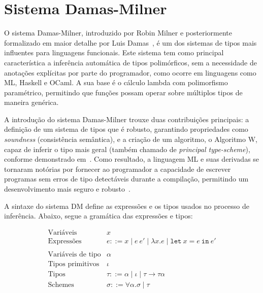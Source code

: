 \chapter{Sistema Damas-Milner}\label{ch:damas-milner}

O sistema Damas-Milner, introduzido por Robin Milner e posteriormente formalizado em maior detalhe por Luis Damas~\cite{MILNER1978, DAMAS1982}, é um dos sistemas de tipos mais influentes para linguagens funcionais.
Este sistema tem como principal característica a inferência automática de tipos polimórficos, sem a necessidade de anotações explícitas por parte do programador, como ocorre em linguagens como ML, Haskell e OCaml.
A sua base é o cálculo lambda com polimorfismo paramétrico, permitindo que funções possam operar sobre múltiplos tipos de maneira genérica.

A introdução do sistema Damas-Milner trouxe duas contribuições principais: a definição de um sistema de tipos que é robusto, garantindo propriedades como \textit{soundness} (consistência semântica), e a criação de um algoritmo, o Algoritmo W, capaz de inferir o tipo mais geral (também chamado de \textit{principal type-scheme}), conforme demonstrado em~.
Como resultado, a linguagem ML e suas derivadas se tornaram notórias por fornecer ao programador a capacidade de escrever programas sem erros de tipo detectáveis durante a compilação, permitindo um desenvolvimento mais seguro e robusto~\cite{MILNER1978, DAMAS1984}.

A sintaxe do sistema DM define as expressões e os tipos usados no processo de inferência.
Abaixo, segue a gramática das expressões e tipos:

\begin{equation}\label{eq:dm-syntax}
  \begin{array}{ll}
    \text{Variáveis}         & x                                                                                 \\
    \text{Expressões}        & e ::= x \mid e \ e' \mid \lambda x.e \mid \texttt{let} \ x = e \ \texttt{in} \ e' \\
    \\
    \text{Variáveis de tipo} & \alpha                                                                            \\
    \text{Tipos primitivos}  & \iota                                                                             \\
    \text{Tipos}             & \tau ::= \alpha \mid \iota \mid \tau \rightarrow \tau
    \alpha                                                                                                       \\
    \text{Schemes}           & \sigma ::= \forall \alpha. \sigma \mid \tau                                       \\
  \end{array}
\end{equation}


